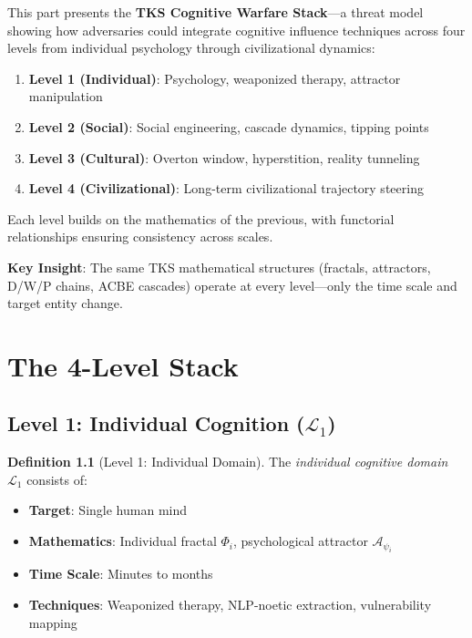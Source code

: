 \documentclass[11pt,twoside]{book}
\theoremstyle{definition}
\newtheorem{definition}{Definition}[chapter]
\theoremstyle{plain}
\theoremstyle{remark}
\newcommand{\Frac}{\Phi}
\newcommand{\PsychAttractor}{\mathcal{A}_\psi}
\newcommand{\LevelI}{\mathcal{L}_1}
\begin{document}
\begin{tcolorbox}[colback=blue!5!white,colframe=blue!75!black,title=\textbf{Part Overview},breakable]
This part presents the \textbf{TKS Cognitive Warfare Stack}---a threat model showing how adversaries could integrate cognitive influence techniques across four levels from individual psychology through civilizational dynamics:

\begin{enumerate}
    \item \textbf{Level 1 (Individual)}: Psychology, weaponized therapy, attractor manipulation
    \item \textbf{Level 2 (Social)}: Social engineering, cascade dynamics, tipping points
    \item \textbf{Level 3 (Cultural)}: Overton window, hyperstition, reality tunneling
    \item \textbf{Level 4 (Civilizational)}: Long-term civilizational trajectory steering
\end{enumerate}

Each level builds on the mathematics of the previous, with functorial relationships ensuring consistency across scales.

\textbf{Key Insight}: The same TKS mathematical structures (fractals, attractors, D/W/P chains, ACBE cascades) operate at every level---only the time scale and target entity change.
\end{tcolorbox}

\chapter{The 4-Level Stack}
\label{ch:cogwar-stack}

\section{Level 1: Individual Cognition ($\LevelI$)}

\begin{definition}[Level 1: Individual Domain]
\label{def:level1}
The \emph{individual cognitive domain} $\LevelI$ consists of:
\begin{itemize}
    \item \textbf{Target}: Single human mind
    \item \textbf{Mathematics}: Individual fractal $\Frac_i$, psychological attractor $\PsychAttractor_i$
    \item \textbf{Time Scale}: Minutes to months
    \item \textbf{Techniques}: Weaponized therapy, NLP-noetic extraction, vulnerability mapping
\end{itemize}
\end{definition}
\end{document}
